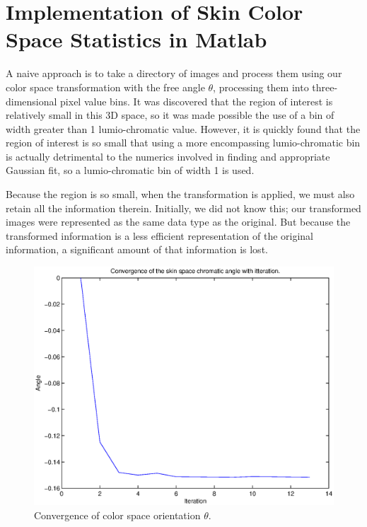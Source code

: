 \section{Implementation of Skin Color Space Statistics in Matlab}\label{sec:SkinColorSpaceStatsMatlab}

A naive approach is to take a directory of images and process them using our color space transformation with the free angle $\theta$, processing them into three-dimensional pixel value bins. It was discovered that the region of interest is relatively small in this 3D space, so it was made possible the use of a bin of width greater than 1 lumio-chromatic value. However, it is quickly found that the region of interest is so small that using a more encompassing lumio-chromatic bin is actually detrimental to the numerics involved in finding and appropriate Gaussian fit, so a lumio-chromatic bin of width 1 is used.

Because the region is so small, when the transformation is applied, we must also retain all the information therein. Initially, we did not know this; our transformed images were represented as the same data type as the original. But because the transformed information is a less efficient representation of the original information, a significant amount of that information is lost.

\begin{figure}[h!]
  \centering
    \includegraphics[width=\textwidth]{Chapter2/Figs/ConvergenceOfSkinSpaceFinal.eps}
    \caption{Convergence of color space orientation $\theta$.}  \label{fig:ConvergenceTheta}
\end{figure}

